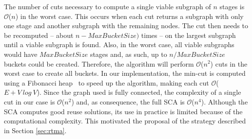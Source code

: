 The number of cuts necessary to compute a single viable subgraph of $n$ stages is $\mathcal{O}$($n$) in the worst case. This occurs when each cut returns a subgraph with only one stage and another subgraph with the remaining nodes. The cut then needs to be recomputed -- about $n-MaxBucketSize)$ times -- on the largest subgraph until a viable subgraph is found. Also, in the worst case, all viable subgraphs would have $MaxBucketSize$ stages and, as such, up to $n/MaxBucketSize$ buckets could be created. Therefore, the algorithm will perform $\mathcal{O}$($n^2$) cuts in the worst case to create all buckets. In our implementation, the min-cut is computed using a Fibonacci heap~\cite{mincut} to speed up the algorithm, making each cut $\mathcal{O}$($E+V\ log\ V$). Since the graph used is fully connected, the complexity of a single cut in our case is $\mathcal{O}$($n^2$) and, as consequence, the full SCA is $\mathcal{O}$($n^4$).  Although the SCA computes good reuse solutions, its use in practice is limited because of the computational complexity.  This motivated the proposal of the strategy described in Section \ref{sec:rtma}.




